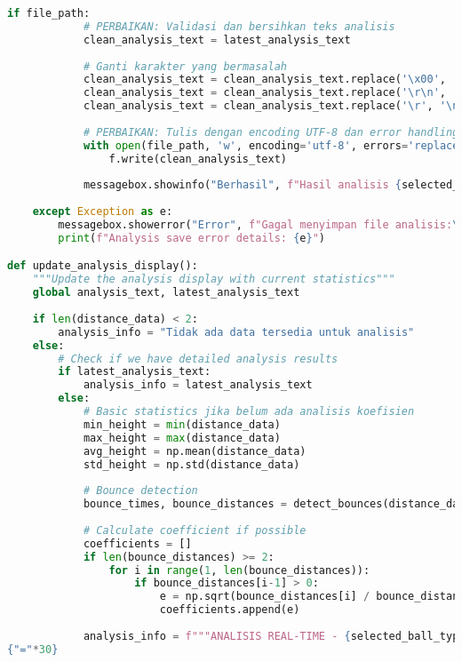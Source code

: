 \begin{itemize}
\begin{scriptsize}
\begin{lstlisting}[language=python]
        if file_path:
            # PERBAIKAN: Validasi dan bersihkan teks analisis
            clean_analysis_text = latest_analysis_text
            
            # Ganti karakter yang bermasalah
            clean_analysis_text = clean_analysis_text.replace('\x00', '')  # Hapus null character
            clean_analysis_text = clean_analysis_text.replace('\r\n', '\n')  # Standardize line endings
            clean_analysis_text = clean_analysis_text.replace('\r', '\n')
            
            # PERBAIKAN: Tulis dengan encoding UTF-8 dan error handling
            with open(file_path, 'w', encoding='utf-8', errors='replace') as f:
                f.write(clean_analysis_text)
            
            messagebox.showinfo("Berhasil", f"Hasil analisis {selected_ball_type} disimpan ke {file_path}")
            
    except Exception as e:
        messagebox.showerror("Error", f"Gagal menyimpan file analisis:\n{str(e)}")
        print(f"Analysis save error details: {e}")

def update_analysis_display():
    """Update the analysis display with current statistics"""
    global analysis_text, latest_analysis_text
    
    if len(distance_data) < 2:
        analysis_info = "Tidak ada data tersedia untuk analisis"
    else:
        # Check if we have detailed analysis results
        if latest_analysis_text:
            analysis_info = latest_analysis_text
        else:
            # Basic statistics jika belum ada analisis koefisien
            min_height = min(distance_data)
            max_height = max(distance_data)
            avg_height = np.mean(distance_data)
            std_height = np.std(distance_data)
            
            # Bounce detection
            bounce_times, bounce_distances = detect_bounces(distance_data, time_data)
            
            # Calculate coefficient if possible
            coefficients = []
            if len(bounce_distances) >= 2:
                for i in range(1, len(bounce_distances)):
                    if bounce_distances[i-1] > 0:
                        e = np.sqrt(bounce_distances[i] / bounce_distances[i-1])
                        coefficients.append(e)
            
            analysis_info = f"""ANALISIS REAL-TIME - {selected_ball_type.upper()}
{"="*30}


\end{lstlisting}
\end{scriptsize}
\end{itemize}
